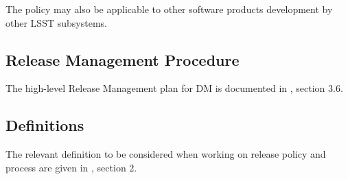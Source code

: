 The policy may also be applicable to other software products development by other \gls{LSST} subsystems.


\subsection{Release Management Procedure} \label{sec:rmproc}

The high-level Release Management plan for \gls{DM} is documented in , section 3.6. 


\subsection{Definitions} \label{sec:defs}

The relevant definition to be considered when working on release policy and process are given in , section 2.
